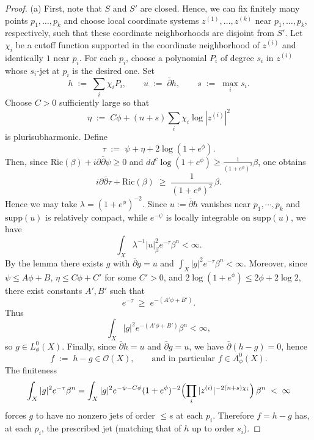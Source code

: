 \documentclass[10pt,a4paper]{amsart}
\newcommand{\Ric}{\mathrm{Ric}}
\newcommand{\idd}{i\partial\bar\partial}
\newcommand{\supp}{\mathrm{supp}}
\begin{document}
\begin{proof}
\noindent (a)
First, note that $S$ and $S'$ are closed. Hence, we can fix finitely many points $p_1,\dots,p_k$ and choose local coordinate systems
$z^{(1)},\dots,z^{(k)}$ near $p_1,\dots,p_k$, respectively, such that these coordinate neighborhoods are disjoint
from $S'$.
Let $\chi_i$ be a cutoff function supported in the coordinate neighborhood of $z^{(i)}$ and identically $1$
near $p_i$.
For each $p_i$, choose a polynomial $P_i$ of degree $s_i$ in $z^{(i)}$ whose $s_i$-jet at $p_i$ is the desired one.
Set
\[
h \;:=\; \sum_i \chi_i P_i,\qquad u\;:=\;\bar\partial h,\qquad s\;:=\;\max_i s_i.
\]
Choose $C>0$ sufficiently large so that
\[
\eta \;:=\; C\phi + (n+s)\sum_i \chi_i \log|z^{(i)}|^2
\]
is plurisubharmonic. Define
\[
\tau \;:=\; \psi+\eta+2\log(1+e^\phi).
\]
Then, since $\Ric(\beta)+\idd\psi\ge 0$ and $dd^c\log(1+e^\phi)\ge\frac{1}{(1+e^\phi)^2}\beta$, one obtains
\[
\idd\tau+\Ric(\beta)\;\ge\;\frac{1}{(1+e^\phi)^2}\,\beta.
\]
Hence we may take $\lambda=(1+e^\phi)^{-2}$.
Since $u:=\bar \partial h$ vanishes near $p_1,\cdots,p_k$ and $\supp(u)$ is relatively compact, while $e^{-\psi}$ is locally integrable on $\supp(u)$, we have
\[
\int_X \lambda^{-1}|u|_\beta^2 e^{-\tau}\beta^n <\infty.
\]
By the lemma there exists $g$ with $\bar\partial g=u$ and $\int_X |g|^2 e^{-\tau}\beta^n<\infty$.
Moreover, since $\psi\le A\phi+B$, $\eta\le C\phi+C'$ for some $C'>0$, and
$2\log(1+e^\phi)\le 2\phi+2\log 2$, there exist constants $A',B'$ such that
\[
e^{-\tau}\;\ge\; e^{-(A'\phi+B')}.
\]
Thus
\[
\int_X |g|^2 e^{-(A'\phi+B')}\beta^n <\infty,
\]
so $g\in L_\phi^0(X)$.
Finally, since $\bar\partial h=u$ and $\bar\partial g=u$, we have $\bar\partial(h-g)=0$, hence
\[
f\;:=\;h-g \in \mathcal{O}(X),
\qquad\text{and in particular } f\in A_\phi^0(X).
\]
The finiteness
\[
\int_X |g|^2 e^{-\tau}\beta^n
=\int_X |g|^2 e^{-\psi-C\phi}(1+e^\phi)^{-2}
\Bigl(\prod_i |z^{(i)}|^{-2(n+s)\chi_i}\Bigr)\,\beta^n \;<\;\infty
\]
forces $g$ to have no nonzero jets of order $\le s$ at each $p_i$.
Therefore $f=h-g$ has, at each $p_i$, the prescribed jet (matching that of $h$ up to order $s_i$).


\end{proof}
\end{document}
